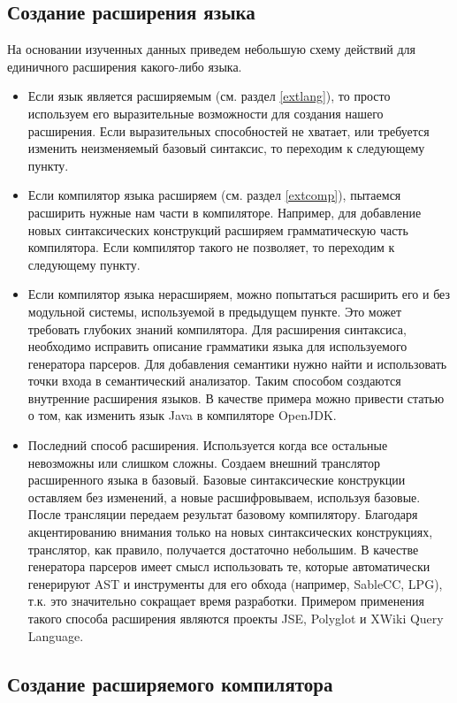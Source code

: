 \documentclass[a4paper,12pt,titlepage]{extarticle}
\begin{document}
\subsection{Создание расширения языка}
На основании изученных данных приведем небольшую схему действий для
единичного расширения какого-либо языка.
\begin{itemize}
  \item Если язык является расширяемым (см. раздел \ref{extlang}), то просто
  используем его выразительные возможности для создания нашего расширения.
  Если выразительных способностей не хватает, или требуется изменить
  неизменяемый базовый синтаксис, то переходим к следующему пункту.
  \item Если компилятор языка расширяем (см. раздел \ref{extcomp}), пытаемся
  расширить нужные нам части в компиляторе. Например, для добавление новых
  синтаксических конструкций расширяем грамматическую часть компилятора. Если
  компилятор такого не позволяет, то переходим к следующему пункту.
  \item Если компилятор языка нерасширяем, можно попытаться расширить его и
  без модульной системы, используемой в предыдущем пункте. Это может требовать
  глубоких знаний компилятора. Для расширения синтаксиса, необходимо исправить
  описание грамматики языка для используемого генератора парсеров. Для
  добавления семантики нужно найти и использовать точки входа в семантический
  анализатор. Таким способом создаются внутренние расширения языков. В качестве
  примера можно привести статью о том, как изменить язык Java
  в компиляторе OpenJDK\cite{modifyjava}.
  \item Последний способ расширения. Используется когда все остальные
  невозможны или слишком сложны. Создаем внешний транслятор расширенного языка
  в базовый. Базовые синтаксические конструкции оставляем без изменений, а
  новые расшифровываем, используя базовые. После трансляции передаем
  результат базовому компилятору.
  Благодаря акцентированию внимания только на новых синтаксических
  конструкциях, транслятор, как правило, получается достаточно небольшим. В
  качестве генератора парсеров имеет смысл использовать те, которые
  автоматически генерируют AST и инструменты для его обхода (например, SableCC,
  LPG), т.к. это значительно сокращает время разработки. Примером применения
  такого способа расширения являются проекты JSE, Polyglot и XWiki Query Language.
\end{itemize}

\subsection{Создание расширяемого компилятора}
\end{document}
